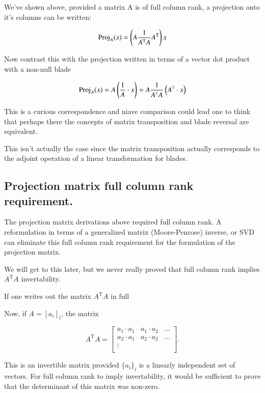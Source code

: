 \documentclass{article}      %
\newcommand{\transpose}[1]{{{#1}^{\text{T}}}}
\begin{document}
We've shown above, provided a matrix A is of full column rank, a projection onto it's columns can be written:

\[
\Proj_A(x) = \left( A \frac{1}{\transpose{A} A} \transpose{A} \right) x
\]

Now contrast this with the projection written in terms of a vector dot product with a non-null blade 

\[
\operatorname{Proj}_A(x) = A \left(\frac{1}{A} \cdot x\right) = A \frac{1}{A^\dagger A} \left(A^\dagger \cdot x\right)
\]

This is a curious correspondence and niave comparison could lead one to think that perhaps there the concepts of matrix
transposition and blade reversal are equivalent.

This isn't actually the case since the matrix transposition actually corresponds to
the adjoint operation of a linear transformation for blades.

\subsection{ Projection matrix full column rank requirement. }

The projection matrix derivations above required full column rank.  A reformulation in terms
of a generalized matrix (Moore-Penrose) inverse, or SVD can eliminate this full column rank requirement for
the formulation of the projection matrix.

We will get to this later, but we never really proved that
full column rank implies $\transpose{A}A$ invertability.

If one writes out the matrix $\transpose{A}A$ in full

Now, if $A = [a_i]_i$, the matrix

\begin{equation}\label{eqn:AtA}
\transpose{A}A
=
\begin{bmatrix}
{a_1} \cdot {a_1} & {a_1} \cdot {a_2} & \hdots \\
{a_2} \cdot {a_1} & {a_2} \cdot {a_2} & \hdots \\
\vdots & & \\
\end{bmatrix}.
\end{equation}

This is an invertible matrix provided $\{a_i\}_i$ is a linearly independent set of vectors.
For full column rank to imply invertability, it would be sufficient to prove that the 
determinant of this matrix was non-zero.
\end{document}
